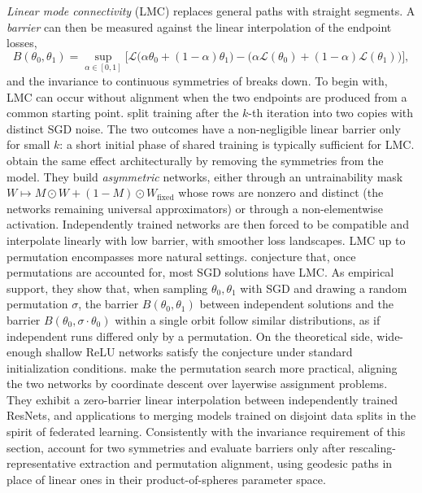 \documentclass[mathematics,review,submit,moreauthors]{Definitions/mdpi}
\begin{document}
\emph{Linear mode connectivity} (LMC) replaces general paths with straight segments.
A \emph{barrier} can then be measured against the linear interpolation of the endpoint losses,
\begin{equation}\label{eq:linear-barrier}
    B(\theta_0,\theta_1)=\sup_{\alpha\in[0,1]}\Big[\mathcal{L}\big(\alpha\theta_0+(1-\alpha)\theta_1\big)-\big(\alpha\mathcal{L}(\theta_0)+(1-\alpha)\mathcal{L}(\theta_1)\big)\Big],
\end{equation}
and the invariance to continuous symmetries of  breaks down.
To begin with, LMC can occur without alignment when the two endpoints are produced from a common starting point.
\citet{frankle2020p3icml} split training after the $k$-th iteration into two copies with distinct SGD noise.
The two outcomes have a non-negligible linear barrier only for small $k$: a short initial phase of shared training is typically sufficient for LMC.
\citet{lim2024} obtain the same effect architecturally by removing the symmetries from the model.
They build \emph{asymmetric} networks, either through an untrainability mask $W\mapsto M\odot W+(1-M)\odot W_{\mathrm{fixed}}$ whose rows are nonzero and distinct (the networks remaining universal approximators) or through a non-elementwise activation.
Independently trained networks are then forced to be compatible and interpolate linearly with low barrier, with smoother loss landscapes.
LMC up to permutation encompasses more natural settings.
\citet{entezari2022} conjecture that, once permutations are accounted for, most SGD solutions have LMC.
As empirical support, they show that, when sampling $\theta_0,\theta_1$ with SGD and drawing a random permutation $\sigma$, the barrier $B(\theta_0,\theta_1)$ between independent solutions and the barrier $B(\theta_0,\sigma\cdot\theta_0)$ within a single orbit follow similar distributions, as if independent runs differed only by a permutation.
On the theoretical side, wide-enough shallow ReLU networks satisfy the conjecture under standard initialization conditions.
\citet{ainsworth2023} make the permutation search more practical, aligning the two networks by coordinate descent over layerwise assignment problems.
They exhibit a zero-barrier linear interpolation between independently trained ResNets, and applications to merging models trained on disjoint data splits in the spirit of federated learning.
Consistently with the invariance requirement of this section, \citet{pittorino2022jsm} account for two symmetries and evaluate barriers only after rescaling-representative extraction and permutation alignment, using geodesic paths in place of linear ones in their product-of-spheres parameter space.
\end{document}
